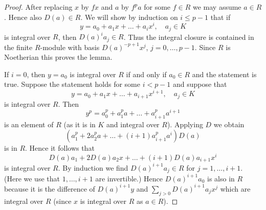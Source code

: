 \documentclass{amsart}
\theoremstyle{plain}
\theoremstyle{definition}
\theoremstyle{remark}
\numberwithin{equation}{subsection}
\begin{document}
\begin{proof}
After replacing $x$ by $fx$ and $a$ by $f^pa$ for some $f \in R$
we may assume $a \in R$. Hence also $D(a) \in R$. We will show
by induction on $i \leq p - 1$ that if
$$
y = a_0 + a_1x + \ldots + a_i x^i,\quad a_j \in K
$$
is integral over $R$, then $D(a)^i a_j \in R$. Thus the integral
closure is contained in the finite $R$-module with basis
$D(a)^{-p + 1}x^j$, $j = 0, \ldots, p - 1$. Since $R$ is Noetherian
this proves the lemma.

\medskip\noindent
If $i = 0$, then $y = a_0$ is integral over $R$ if and only if $a_0 \in R$
and the statement is true. Suppose the statement holds for some $i < p - 1$
and suppose that
$$
y = a_0 + a_1x + \ldots + a_{i + 1} x^{i + 1},\quad a_j \in K
$$
is integral over $R$. Then
$$
y^p = a_0^p + a_1^p a + \ldots + a_{i + 1}^pa^{i + 1}
$$
is an element of $R$ (as it is in $K$ and integral over $R$). Applying
$D$ we obtain
$$
(a_1^p + 2a_2^p a + \ldots + (i + 1)a_{i + 1}^p a^i)D(a)
$$
is in $R$. Hence it follows that
$$
D(a)a_1 + 2D(a) a_2 x + \ldots + (i + 1)D(a) a_{i + 1} x^i
$$
is integral over $R$. By induction we find $D(a)^{i + 1}a_j \in R$
for $j = 1, \ldots, i + 1$. (Here we use that $1, \ldots, i + 1$
are invertible.) Hence $D(a)^{i + 1}a_0$ is also in $R$ because it is the
difference of $D(a)^{i + 1}y$ and $\sum_{j > 0} D(a)^{i + 1}a_jx^j$ which
are integral over $R$ (since $x$ is integral over $R$ as $a \in R$).
\end{proof}
\end{document}
